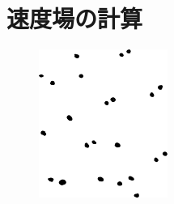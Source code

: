 \section{速度場の計算}

\begin{figure}
	\centering
	
	\begin{minipage}[b]{0.2\linewidth}
		\centering
		\includegraphics[width=\linewidth]{./pic/outflow_ex1.png}
		\subcaption{}
		\label{}
	\end{minipage}
	\begin{minipage}[b]{0.2\linewidth}
		\centering

\end{minipage}
\end{figure}
